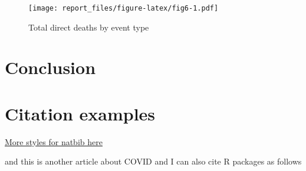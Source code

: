 \documentclass[
]{article}
\begin{document}
\begin{figure}
\centering
\texttt{[image: report\_files/figure-latex/fig6-1.pdf]}
\caption{Total direct deaths by event type}
\end{figure}

\clearpage

\hypertarget{conclusion}{%
\section{Conclusion}\label{conclusion}}

\clearpage

\hypertarget{citation-examples}{%
\section{Citation examples}\label{citation-examples}}

\href{https://www.overleaf.com/learn/latex/Natbib_bibliography_styles}{More
styles for natbib here}

\citet{BC64} and this is another article about COVID
\citet{bai2020presumed} and I can also cite R packages as follows
\citet{ggplot2}

  
\end{document}
